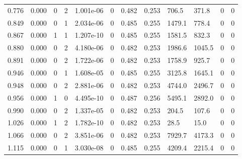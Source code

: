 \documentclass[preview]{standalone}
\begin{document}
{{\begin{tabular}{L{1.2cm}C{1.2cm} C{0.3cm}C{0.5cm} C{1.4cm}C{1.4cm} C{1.4cm}C{1.4cm} C{1.6cm}C{1.6cm} C{1.6cm}C{1.6cm}}
  0.776  &  0.000  & 0     &  2 &  1.001e-06  & 0  &  0.482&   0.253& 706.5 & 371.8   &  0 & 0  \\ 
  0.849  &  0.000  & 0     &  1 &  2.034e-06  & 0  &  0.485&   0.255& 1479.1 & 778.4   &  0 & 0  \\ 
  0.867  &  0.000  & 1     &  1 &  1.207e-10  & 0  &  0.485&   0.255& 1581.5 & 832.3   &  0 & 0  \\ 
  0.880  &  0.000  & 0     &  2 &  4.180e-06  & 0  &  0.482&   0.253& 1986.6 & 1045.5   &  0 & 0  \\ 
  0.891  &  0.000  & 0     &  2 &  1.722e-06  & 0  &  0.482&   0.253& 1758.9 & 925.7   &  0 & 0  \\ 
  0.946  &  0.000  & 0     &  1 &  1.608e-05  & 0  &  0.485&   0.255& 3125.8 & 1645.1   &  0 & 0  \\ 
  0.948  &  0.000  & 0     &  2 &  2.881e-06  & 0  &  0.482&   0.253& 4744.0 & 2496.7   &  0 & 0  \\ 
  0.956  &  0.000  & 1     &  0 &  4.495e-10  & 0  &  0.487&   0.256& 5495.1 & 2892.0   &  0 & 0  \\ 
  0.990  &  0.000  & 0     &  2 &  1.337e-05  & 0  &  0.482&   0.253& 204.5 & 107.6   &  0 & 0  \\ 
  1.026  &  0.000  & 1     &  2 &  1.782e-10  & 0  &  0.482&   0.253& 28.5 & 15.0   &  0 & 0  \\ 
  1.066  &  0.000  & 0     &  2 &  3.851e-06  & 0  &  0.482&   0.253& 7929.7 & 4173.3   &  0 & 0  \\ 
  1.115  &  0.000  & 0     &  1 &  3.030e-08  & 0  &  0.485&   0.255& 4209.4 & 2215.4   &  0 & 0  \\ 
\hline 
\end{tabular} 

}}
\end{document}
